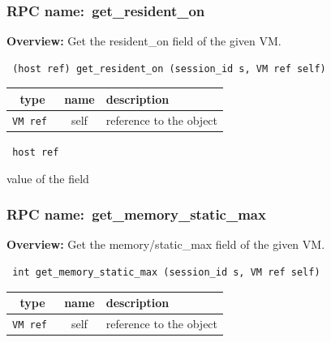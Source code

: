 \vspace{0.3cm}
\vspace{0.3cm}
\vspace{0.3cm}
\subsubsection{RPC name:~get\_resident\_on}

{\bf Overview:} 
Get the resident\_on field of the given VM.

\begin{verbatim} (host ref) get_resident_on (session_id s, VM ref self)\end{verbatim}



 
\vspace{0.3cm}
\begin{tabular}{|c|c|p{7cm}|}
 \hline
{\bf type} & {\bf name} & {\bf description} \\ \hline
{\tt VM ref } & self & reference to the object \\ \hline 

\end{tabular}

\vspace{0.3cm}

{\tt 
host ref
}


value of the field
\vspace{0.3cm}
\vspace{0.3cm}
\vspace{0.3cm}
\subsubsection{RPC name:~get\_memory\_static\_max}

{\bf Overview:} 
Get the memory/static\_max field of the given VM.

\begin{verbatim} int get_memory_static_max (session_id s, VM ref self)\end{verbatim}



 
\vspace{0.3cm}
\begin{tabular}{|c|c|p{7cm}|}
 \hline
{\bf type} & {\bf name} & {\bf description} \\ \hline
{\tt VM ref } & self & reference to the object \\ \hline 

\end{tabular}

